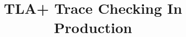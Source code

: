 \documentclass{vldb}
\begin{document}

\title{TLA+ Trace Checking In Production}



%
%
%
%
\end{document}
